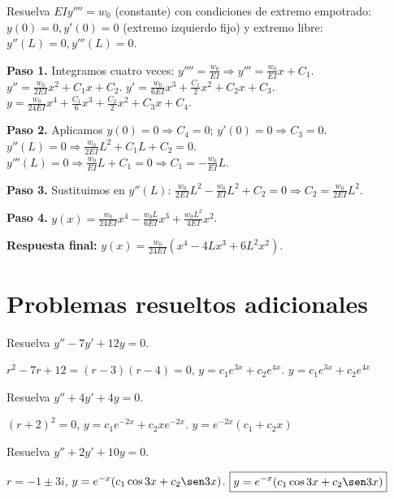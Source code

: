 \begin{example}
Resuelva $EI y'''' = w_0$ (constante) con condiciones de extremo empotrado: $y(0)=0, y'(0)=0$ (extremo izquierdo fijo) y extremo libre: $y''(L)=0, y'''(L)=0$.

\begin{myproof}
\textbf{Paso 1.} Integramos cuatro veces:
$y'''' = \frac{w_0}{EI} \Rightarrow y''' = \frac{w_0}{EI}x + C_1$.
$y'' = \frac{w_0}{2EI}x^2 + C_1 x + C_2$.
$y' = \frac{w_0}{6EI}x^3 + \frac{C_1}{2}x^2 + C_2 x + C_3$.
$y = \frac{w_0}{24EI}x^4 + \frac{C_1}{6}x^3 + \frac{C_2}{2}x^2 + C_3 x + C_4$.

\textbf{Paso 2.} Aplicamos $y(0)=0 \Rightarrow C_4=0$; $y'(0)=0 \Rightarrow C_3=0$.
$y''(L)=0 \Rightarrow \frac{w_0}{2EI}L^2 + C_1 L + C_2 = 0$.
$y'''(L)=0 \Rightarrow \frac{w_0}{EI}L + C_1 = 0 \Rightarrow C_1 = -\frac{w_0}{EI}L$.

\textbf{Paso 3.} Sustituimos en $y''(L)$: $\frac{w_0}{2EI}L^2 - \frac{w_0}{EI}L^2 + C_2 = 0 \Rightarrow C_2 = \frac{w_0}{2EI}L^2$.

\textbf{Paso 4.} $y(x) = \frac{w_0}{24EI}x^4 - \frac{w_0 L}{6EI}x^3 + \frac{w_0 L^2}{4EI}x^2$.

\textbf{Respuesta final:} $\boxed{y(x) = \frac{w_0}{24EI}(x^4 - 4L x^3 + 6L^2 x^2).}$
\end{myproof}
\end{example}

\section{Problemas resueltos adicionales}

\begin{prob}
Resuelva $y'' - 7y' + 12y = 0$.
\begin{myproof}
$r^2-7r+12=(r-3)(r-4)=0$, $y=c_1 e^{3x}+c_2 e^{4x}$. $\boxed{y=c_1 e^{3x}+c_2 e^{4x}}$
\end{myproof}
\end{prob}

\begin{prob}
Resuelva $y'' + 4y' + 4y = 0$.
\begin{myproof}
$(r+2)^2=0$, $y=c_1 e^{-2x}+c_2 x e^{-2x}$. $\boxed{y=e^{-2x}(c_1+c_2 x)}$
\end{myproof}
\end{prob}

\begin{prob}
Resuelva $y'' + 2y' + 10y = 0$.
\begin{myproof}
$r=-1\pm 3i$, $y=e^{-x}(c_1 \cos 3x + c_2 \sen 3x)$. $\boxed{y=e^{-x}(c_1\cos 3x+c_2\sen 3x)}$
\end{myproof}
\end{prob}

